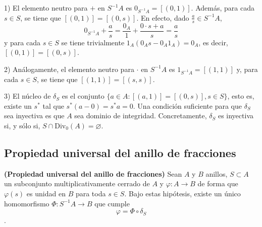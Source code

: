 \documentclass[../main.tex]{subfiles}
\begin{document}
	\begin{remark}\label{iny}
		1) El elemento neutro para $+$ en $S^{-1}A$ es $0_{S^{-1}A}=[(0,1)]$. Además, para cada $s\in S$, se tiene que $[(0,1)]=[(0,s)]$. En efecto, dado $\frac{a}{s}\in S^{-1}A$, $$0_{S^{-1}A}+\frac{a}{s}=\frac{0_A}{1}+\frac{0\cdot s+a}{s}=\frac{a}{s}$$
		y para cada $s\in S$ se tiene trivialmente $1_A(0_As-0_A1_A)=0_A$, es decir, $[(0,1)]=[(0,s)]$.

		2) Análogamente, el elemento neutro para $·$ en $S^{-1}A$ es $1_{S^{-1}A}=[(1,1)]$ y, para cada $s\in S$, se tiene que $[(1,1)]=[(s,s)]$.

		3) El núcleo de $\delta_S$ es el conjunto $\{a\in A:[(a,1)]=[(0,s)], s\in S\}$, esto es, existe un $s^{\ast}$ tal que $s^{\ast}(a-0)=s^{\ast}a=0$. Una condición suficiente para que $\delta_S$ sea inyectiva es que $A$ sea dominio de integridad. Concretamente, $\delta_S$ es inyectiva si, y sólo si, $S\cap\operatorname{Div_0}(A)=\varnothing$.
	\end{remark}

	\subsection{Propiedad universal del anillo de fracciones}
	\begin{theorem}\textbf{(Propiedad universal del anillo de fracciones)} Sean $A$ y $B$ anillos, $S\subset A$ un subconjunto multiplicativamente cerrado de $A$ y $\varphi:A\longrightarrow B$ de forma que $\varphi(s)$ es unidad en $B$ para toda $s\in S$. Bajo estas hipótesis, existe un único homomorfismo $\Phi:S^{-1}A\longrightarrow B$ que cumple
		$$\varphi=\Phi\circ\delta_S$$.
	\end{theorem}
\end{document}
